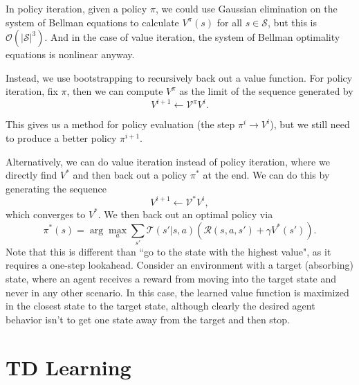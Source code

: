 \documentclass[twoside,10pt]{report}
\begin{document}
In policy iteration, given a policy $\pi$, we could use Gaussian elimination on the system of Bellman equations to calculate $V^{\pi}(s)$ for all $s \in \mathcal{S}$, but this is $\mathcal{O}(|\mathcal{S}|^{3})$. And in the case of value iteration, the system of Bellman optimality equations is nonlinear anyway.

Instead, we use bootstrapping to recursively back out a value function. For policy iteration, fix $\pi$, then we can compute $V^{\pi}$ as the limit of the sequence generated by
\[
V^{i+1} \gets \mathcal{V}^{\pi} V^{i}.
\] 

This gives us a method for policy evaluation (the step $\pi^{i} \to V^{i}$), but we still need to produce a better policy $\pi^{i+1}$.


Alternatively, we can do value iteration instead of policy iteration, where we directly find $V^{*}$ and then back out a policy $\pi^{*}$ at the end. We can do this by generating the sequence
\[
V^{i+1} \gets \mathcal{V}^{*} V^{i},
\] which converges to $V^{*}$. We then back out an optimal policy via
\[
	\pi^{*}(s) = \arg \max_{a} \sum_{s'} \mathcal{T}(s'|s,a) \left( \mathcal{R}(s,a,s') + \gamma V^{*}(s') \right).
\]
Note that this is different than ``go to the state with the highest value", as it requires a one-step lookahead. Consider an environment with a target (absorbing) state, where an agent receives a reward from moving into the target state and never in any other scenario. In this case, the learned value function is maximized in the closest state to the target state, although clearly the desired agent behavior isn't to get one state away from the target and then stop.


\section{TD Learning}

\end{document}
